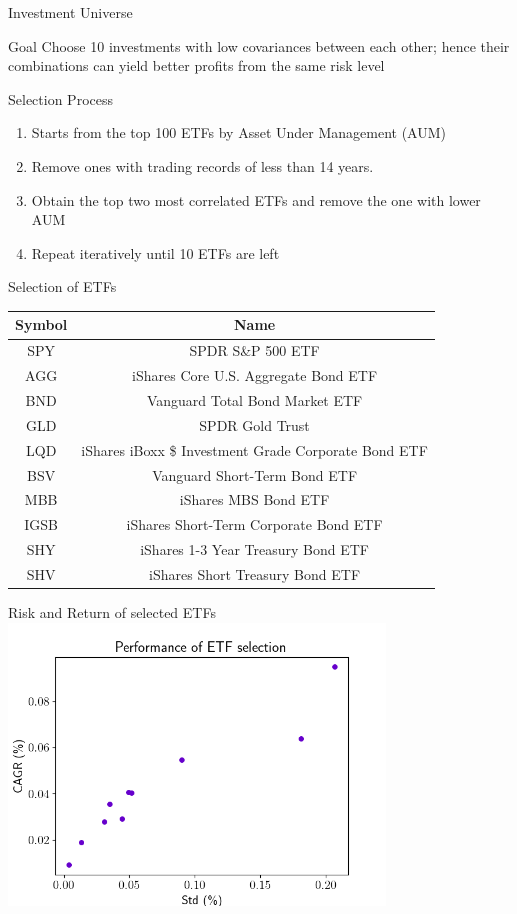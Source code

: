 \begin{frame}{Investment Universe}
\begin{block}{Goal}
Choose 10 investments with low covariances between each other; hence their combinations can yield better profits from the same risk level
\end{block}
\begin{block}{Selection Process}
    \begin{enumerate}
    \item Starts from the top 100 ETFs by Asset Under Management (AUM)
    \item Remove ones with trading records of less than 14 years.
    \item \label{itm:remove_items} Obtain the top two most correlated ETFs and remove the one with lower AUM
    \item Repeat \mynum{\ref{itm:remove_items}} iteratively until 10 ETFs are left
    \end{enumerate}
\end{block}
\end{frame}

\begin{frame}{Selection of ETFs}
    \begin{tabular}{|| c | c ||}
    \hline
    Symbol & Name  \\ \hline \hline
    SPY&SPDR S\&P 500 ETF \\ \hline
    AGG&iShares Core U.S. Aggregate Bond ETF \\ \hline
    BND&Vanguard Total Bond Market ETF \\ \hline
    GLD&SPDR Gold Trust \\ \hline
    LQD&iShares iBoxx \$ Investment Grade Corporate Bond ETF \\ \hline
    BSV&Vanguard Short-Term Bond ETF \\ \hline
    MBB&iShares MBS Bond ETF \\ \hline
    IGSB&iShares Short-Term Corporate Bond ETF \\ \hline
    SHY&iShares 1-3 Year Treasury Bond ETF \\ \hline
    SHV&iShares Short Treasury Bond ETF \\ \hline
    \end{tabular}
\end{frame}

\begin{frame}{Risk and Return of selected ETFs}
\centering
\includegraphics[width=10cm]{images/etfs.png}
\end{frame}

